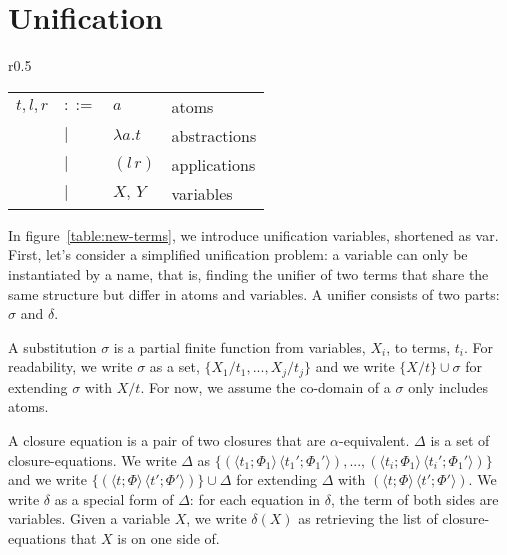 \documentclass[a4paper,UKenglish]{lipics-v2016}
\newcommand{\clos}[2] {
  \langle #1; #2 \rangle
}
\newcommand{\app}[2] {
  (#1\, #2)
}
\newcommand{\pr}[2] {
 (#1\, #2)
}
\newcommand{\bd}[2] {
 #1/ #2
}
\begin{document}
\section{Unification}
\label{unify}
\begin{wrapfigure}{r}{0.5\textwidth}
  \caption{Unification terms\label{table:new-terms}}
    \begin{tabular}{r l l l}  
    $t,l,r$ & $::=$ & $a$ & atoms \\
    & $|$ & $\lambda a.t$ & abstractions \\
    & $|$ & $\app{l}{r}$ & applications \\
    & $|$ & $X,\,Y$ & variables \\
    \end{tabular}
\end{wrapfigure}
In figure~\ref{table:new-terms}, we introduce unification variables,
shortened as var.  First, let's consider a simplified unification
problem: a variable can only be instantiated by a name, that is,
finding the unifier of two terms that share the same structure but
differ in atoms and variables.  A unifier consists of two parts:
$\sigma$ and $\delta$.
\begin{definition}
  A substitution $\sigma$ is a partial finite function from variables,
  $X_i$, to terms, $t_i$.  For readability, we write $\sigma$ as a
  set, $\{\bd{X_1}{t_1}, ..., \bd{X_j}{t_j}\}$ and we write
  $\{\bd{X}{t}\} \cup \sigma$ for extending $\sigma$ with $\bd{X}{t}$.
  For now, we assume the co-domain of a $\sigma$ only includes atoms.
\end{definition}

\begin{definition}
  A closure equation is a pair of two closures that are
  $\alpha$-equivalent.  $\Delta$ is a set of closure-equations.  We
  write $\Delta$ as $\{\pr{\clos{t_1}{\Phi_1}}{\clos{t_1'}{\Phi_1'}},
  ..., \pr{\clos{t_i}{\Phi_1}}{\clos{t_i'}{\Phi_1'}}\}$ and we write
  $\{\pr{\clos{t}{\Phi}}{\clos{t'}{\Phi'}}\}\cup\Delta$ for extending
  $\Delta$ with $\pr{\clos{t}{\Phi}}{\clos{t'}{\Phi'}}$.  We write
  $\delta$ as a special form of $\Delta$: for each equation in
  $\delta$, the term of both sides are variables.  Given a variable
  $X$, we write $\delta(X)$ as retrieving the list of
  closure-equations that $X$ is on one side of.
\end{definition}
\end{document}
